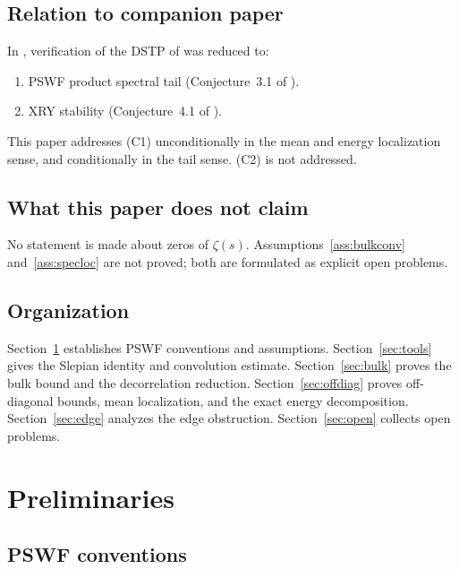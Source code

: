 \documentclass[12pt,a4paper]{amsart}
\theoremstyle{definition}
\begin{document}
\subsection{Relation to companion paper}\label{ssec:context}

In \cite{PaperII_quad}, verification of the DSTP of \cite{PaperI}
was reduced to:
\begin{enumerate}[(C1)]
  \item PSWF product spectral tail (Conjecture~3.1 of \cite{PaperII_quad}).
  \item XRY stability (Conjecture~4.1 of \cite{PaperII_quad}).
\end{enumerate}
This paper addresses (C1) unconditionally in the mean and energy
localization sense, and conditionally in the tail sense.
(C2) is not addressed.

\subsection{What this paper does not claim}

No statement is made about zeros of $\zeta(s)$.
Assumptions~\ref{ass:bulkconv} and~\ref{ass:specloc} are not proved;
both are formulated as explicit open problems.

\subsection{Organization}

Section~\ref{sec:prelim} establishes PSWF conventions and assumptions.
Section~\ref{sec:tools} gives the Slepian identity and convolution estimate.
Section~\ref{sec:bulk} proves the bulk bound and the decorrelation reduction.
Section~\ref{sec:offdiag} proves off-diagonal bounds, mean localization,
and the exact energy decomposition.
Section~\ref{sec:edge} analyzes the edge obstruction.
Section~\ref{sec:open} collects open problems.

\section{Preliminaries}\label{sec:prelim}

\subsection{PSWF conventions}
\end{document}
